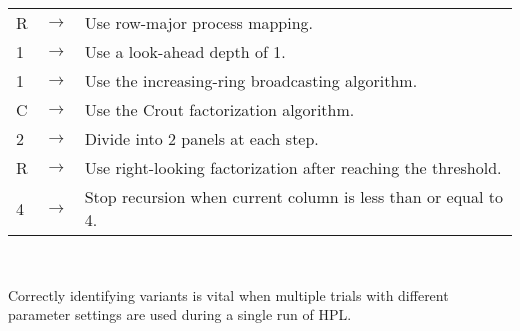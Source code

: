 \documentclass[a4paper, 11pt]{article}
\begin{document}
\begin{tabular}{ l l l }
R & $\rightarrow$ & Use row-major process mapping. \\
1 & $\rightarrow$ & Use a look-ahead depth of 1. \\
1 & $\rightarrow$ & Use the increasing-ring broadcasting algorithm. \\
C & $\rightarrow$ & Use the Crout factorization algorithm. \\
2 & $\rightarrow$ & Divide into 2 panels at each step. \\
R & $\rightarrow$ & Use right-looking factorization after reaching the threshold. \\
4 & $\rightarrow$ & Stop recursion when current column is less than or equal to 4. \\
\end{tabular}

\

Correctly identifying variants is vital when multiple trials with different parameter settings are used during a single run of HPL.






\end{document}
